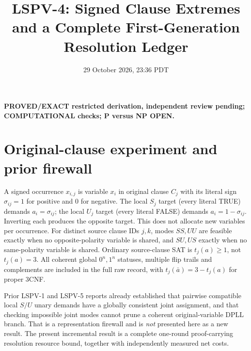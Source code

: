 \documentclass[11pt]{article}
\title{LSPV-4: Signed Clause Extremes and a Complete First-Generation Resolution Ledger}
\date{29 October 2026, 23:36 PDT}
\begin{document}
\maketitle
\noindent\textbf{PROVED/EXACT restricted derivation, independent review pending; COMPUTATIONAL checks; P versus NP OPEN.}

\section{Original-clause experiment and prior firewall}
A signed occurrence $x_{i,j}$ is variable $x_i$ in original clause $C_j$ with its literal sign $\sigma_{ij}=1$ for positive and $0$ for negative. The local $S_j$ target (every literal TRUE) demands $a_i=\sigma_{ij}$; the local $U_j$ target (every literal FALSE) demands $a_i=1-\sigma_{ij}$. Inverting each produces the opposite target. This does not allocate new variables per occurrence. For distinct source clause IDs $j,k$, modes $SS,UU$ are feasible exactly when no opposite-polarity variable is shared, and $SU,US$ exactly when no same-polarity variable is shared. Ordinary source-clause SAT is $t_j(a)\ge1$, not $t_j(a)=3$. All coherent global $0^n,1^n$ statuses, multiple flip trails and complements are included in the full raw record, with $t_j(\bar a)=3-t_j(a)$ for proper 3CNF.

Prior LSPV-1 and LSPV-5 reports already established that pairwise compatible local $S/U$ unary demands have a globally consistent joint assignment, and that checking impossible joint modes cannot prune a coherent original-variable DPLL branch. That is a representation firewall and is \emph{not} presented here as a new result. The present incremental result is a complete one-round proof-carrying resolution resource bound, together with independently measured net costs.
\end{document}
